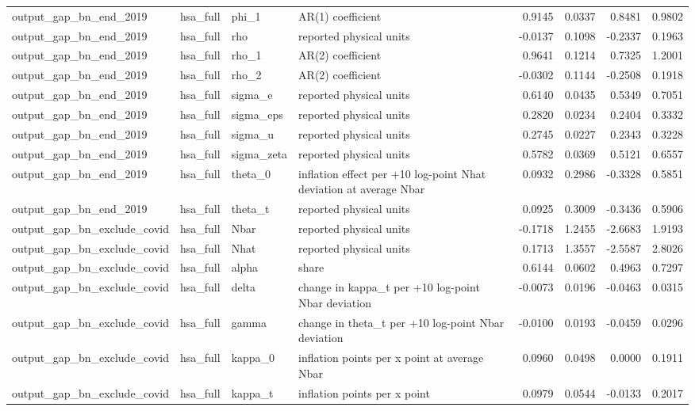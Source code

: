 \begin{tabular}{llllrrrr}
output\_gap\_bn\_end\_2019 & hsa\_full & phi\_1 & AR(1) coefficient & 0.9145 & 0.0337 & 0.8481 & 0.9802 \\
output\_gap\_bn\_end\_2019 & hsa\_full & rho & reported physical units & -0.0137 & 0.1098 & -0.2337 & 0.1963 \\
output\_gap\_bn\_end\_2019 & hsa\_full & rho\_1 & AR(2) coefficient & 0.9641 & 0.1214 & 0.7325 & 1.2001 \\
output\_gap\_bn\_end\_2019 & hsa\_full & rho\_2 & AR(2) coefficient & -0.0302 & 0.1144 & -0.2508 & 0.1918 \\
output\_gap\_bn\_end\_2019 & hsa\_full & sigma\_e & reported physical units & 0.6140 & 0.0435 & 0.5349 & 0.7051 \\
output\_gap\_bn\_end\_2019 & hsa\_full & sigma\_eps & reported physical units & 0.2820 & 0.0234 & 0.2404 & 0.3332 \\
output\_gap\_bn\_end\_2019 & hsa\_full & sigma\_u & reported physical units & 0.2745 & 0.0227 & 0.2343 & 0.3228 \\
output\_gap\_bn\_end\_2019 & hsa\_full & sigma\_zeta & reported physical units & 0.5782 & 0.0369 & 0.5121 & 0.6557 \\
output\_gap\_bn\_end\_2019 & hsa\_full & theta\_0 & inflation effect per +10 log-point Nhat deviation at average Nbar & 0.0932 & 0.2986 & -0.3328 & 0.5851 \\
output\_gap\_bn\_end\_2019 & hsa\_full & theta\_t & reported physical units & 0.0925 & 0.3009 & -0.3436 & 0.5906 \\
output\_gap\_bn\_exclude\_covid & hsa\_full & Nbar & reported physical units & -0.1718 & 1.2455 & -2.6683 & 1.9193 \\
output\_gap\_bn\_exclude\_covid & hsa\_full & Nhat & reported physical units & 0.1713 & 1.3557 & -2.5587 & 2.8026 \\
output\_gap\_bn\_exclude\_covid & hsa\_full & alpha & share & 0.6144 & 0.0602 & 0.4963 & 0.7297 \\
output\_gap\_bn\_exclude\_covid & hsa\_full & delta & change in kappa\_t per +10 log-point Nbar deviation & -0.0073 & 0.0196 & -0.0463 & 0.0315 \\
output\_gap\_bn\_exclude\_covid & hsa\_full & gamma & change in theta\_t per +10 log-point Nbar deviation & -0.0100 & 0.0193 & -0.0459 & 0.0296 \\
output\_gap\_bn\_exclude\_covid & hsa\_full & kappa\_0 & inflation points per x point at average Nbar & 0.0960 & 0.0498 & 0.0000 & 0.1911 \\
output\_gap\_bn\_exclude\_covid & hsa\_full & kappa\_t & inflation points per x point & 0.0979 & 0.0544 & -0.0133 & 0.2017 \\

\end{tabular}
